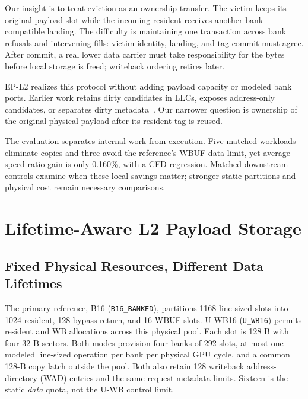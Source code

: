 \documentclass[conference,letterpaper]{IEEEtran}
\newcommand{\base}{B16}
\newcommand{\unif}{U-WB16}
\begin{document}
Our insight is to treat eviction as an ownership transfer. The victim keeps its original payload slot while the incoming resident receives another bank-compatible landing. The difficulty is maintaining one transaction across bank refusals and intervening fills: victim identity, landing, and tag commit must agree. After commit, a real lower data carrier must take responsibility for the bytes before local storage is freed; writeback ordering retires later.

EP-L2 realizes this protocol without adding payload capacity or modeled bank ports. Earlier work retains dirty candidates in LLCs, exposes address-only candidates, or separates dirty metadata~\cite{vwq,lastwrite,dbi}. Our narrower question is ownership of the original physical payload after its resident tag is reused.

The evaluation separates internal work from execution. Five matched workloads eliminate copies and three avoid the reference's WBUF-data limit, yet average speed-ratio gain is only 0.160\%, with a CFD regression. Matched downstream controls examine when these local savings matter; stronger static partitions and physical cost remain necessary comparisons.

\section{Lifetime-Aware L2 Payload Storage}
\subsection{Fixed Physical Resources, Different Data Lifetimes}
The primary reference, \base{} (\texttt{B16\_BANKED}), partitions 1168 line-sized slots into 1024 resident, 128 bypass-return, and 16 WBUF slots. \unif{} (\texttt{U\_WB16}) permits resident and WB allocations across this physical pool. Each slot is 128 B with four 32-B sectors. Both modes provision four banks of 292 slots, at most one modeled line-sized operation per bank per physical GPU cycle, and a common 128-B copy latch outside the pool. Both also retain 128 writeback address-directory (WAD) entries and the same request-metadata limits. Sixteen is the static \emph{data} quota, not the U-WB control limit.
\end{document}
